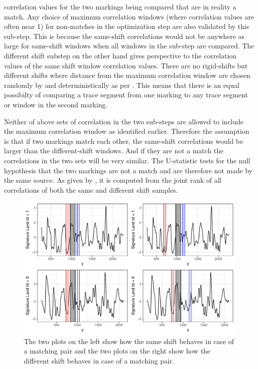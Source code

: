 \documentclass[12pt]{article}
\begin{document}
correlation values for the two markings being compared that are in
reality a match. Any choice of maximum correlation windows (where
correlation values are often near 1) for non-matches in the optimization
step are also validated by this sub-step. This is because the same-shift
correlations would not be anywhere as large for same-shift windows when
all windows in the sub-step are compared. The different shift substep on
the other hand gives perspective to the correlation values of the same
shift window correlation values. There are no rigid-shifts but different
shifts where distance from the maximum correlation window are chosen
randomly by \citet{chumbley} and deterministically as per
\citet{hadler}. This means that there is an equal possibilty of
comparing a trace segment from one marking to any trace segment or
window in the second marking.

Neither of above sets of correlation in the two sub-steps are allowed to
include the maximum correlation window as identified earlier. Therefore
the assumption is that if two markings match each other, the same-shift
correlations would be larger than the different-shift windows. And if
they are not a match the correlations in the two sets will be very
similar. The U-statistic tests for the null hypothesis that the two
markings are not a match and are therefore not made by the same source.
As given by \citet{hadler}, it is computed from the joint rank of all
correlations of both the same and different shift samples.

\begin{figure}

{\centering \includegraphics[width=\textwidth]{figures/win-comparison-1} 

}

\caption{ The two plots on the left show how the same shift behaves in case of a matching pair and the two plots on the right show how the different shift behaves in case of a matching pair.}\label{fig:win-comparison}
\end{figure}
\end{document}
